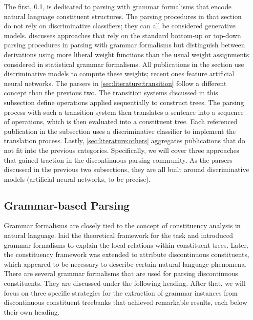\documentclass[../document.tex]{subfiles}
\begin{document}
    The first, \cref{sec:literature:grammar}, is dedicated to parsing with grammar formalisms that encode natural language constituent structures.
    The parsing procedures in that section do not rely on discriminative classifiers; they can all be considered generative models.
     discusses approaches that rely on the standard bottom-up or top-down parsing procedures in parsing with grammar formalisms but distinguish between derivations using more liberal weight functions than the usual weight assignments considered in statistical grammar formalisms.
    All publications in the section use discriminative models to compute these weights; recent ones feature artificial neural networks.
    The parsers in \cref{sec:literature:transition} follow a different concept than the previous two.
    The transition systems discussed in this subsection define operations applied sequentially to construct trees.
    The parsing process with such a transition system then translates a sentence into a sequence of operations, which is then evaluated into a constituent tree.
    Each referenced publication in the subsection uses a discriminative classifier to implement the translation process.
    Lastly, \cref{sec:literature:others} aggregates publications that do not fit into the previous categories.
    Specifically, we will cover three approaches that gained traction in the discontinuous parsing community.
    As the parsers discussed in the previous two subsections, they are all built around discriminative models (artificial neural networks, to be precise). 
    
    \subsection{Grammar-based Parsing}\label{sec:literature:grammar}
    Grammar formalisms are closely tied to the concept of constituency analysis in natural language.
    \citet{Cho56} laid the theoretical framework for the task and introduced grammar formalisms to explain the local relations within constituent trees.
    Later, the constituency framework was extended to attribute discontinuous constituents, which appeared to be necessary to describe certain natural language phenomena. \citep{Shieber85}
    There are several grammar formalisms that are used for parsing discontinuous constituents.
    They are discussed under the following heading.
    After that, we will focus on three specific strategies for the extraction of grammar instances from discontinuous constituent treebanks that achieved remarkable results, each below their own heading.
\end{document}
